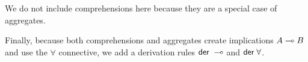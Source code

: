 

We do not include comprehensions here because they are a special case of
aggregates.

Finally, because both comprehensions and aggregates create implications $A \multimap
B$ and use the $\forall$ connective, we add a derivation rules $\mathsf{der} \; \multimap$
and $\mathsf{der} \; \forall$.


